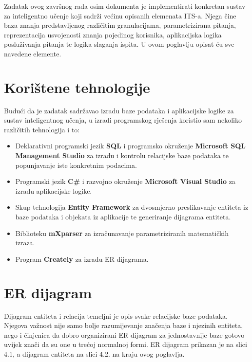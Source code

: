 \documentclass[times, utf8, zavrsni, numeric]{fer}
\begin{document}
Zadatak ovog završnog rada osim dokumenta je implementirati konkretan sustav za inteligentno učenje koji sadrži većinu opisanih elemenata ITS-a. Njega čine baza znanja predstavljenog različitim granulacijama, parametrizirana pitanja, reprezentacija usvojenosti znanja pojedinog korisnika, aplikacijska logika posluživanja pitanja te logika slaganja ispita. U ovom poglavlju opisat ću sve navedene elemente.

\section{Korištene tehnologije}

Budući da je zadatak sadržavao izradu baze podataka i aplikacijske logike za sustav inteligentnog učenja, u izradi programskog rješenja koristio sam nekoliko različitih tehnologija i to:
\begin{itemize}
	\item Deklarativni programski jezik \textbf{SQL} i programsko okruženje \textbf{Microsoft SQL Management Studio} za izradu i kontrolu relacijske baze podataka te popunjavanje iste konkretnim podacima.
	\item Programski jezik \textbf{C\#} i razvojno okruženje \textbf{Microsoft Visual Studio} za izradu aplikacijske logike.
	\item Skup tehnologija \textbf{Entity Framework} za dvosmjerno preslikavanje entiteta iz baze podataka i objekata iz aplikacije te generiranje dijagrama entiteta.
	\item Biblioteku \textbf{mXparser} za izračunavanje parametriziranih matematičkih izraza.
	\item Program \textbf{Creately} za izradu ER dijagrama.
\end{itemize}

\section{ER dijagram}
Dijagram entiteta i relacija temeljni je opis svake relacijske baze podataka. Njegova važnost nije samo bolje razumijevanje značenja baze i njezinih entiteta, nego i činjenica da dobro organizirani ER dijagram za jednostavnije baze gotovo uvijek znači da su one u trećoj normalnoj formi. ER dijagram prikazan je na slici 4.1, a dijagram entiteta na slici 4.2. na kraju ovog poglavlja.
\end{document}

